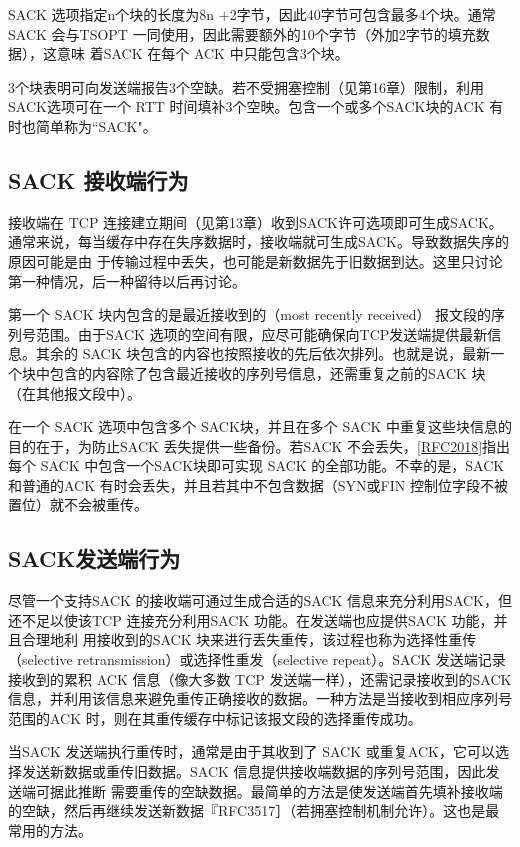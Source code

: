 SACK 选项指定n个块的长度为8n +2字节，因此40字节可包含最多4个块。通常SACK 会与TSOPT 一同使用，因此需要额外的10个字节（外加2字节的填充数据），这意味
着SACK 在每个 ACK 中只能包含3个块。

3个块表明可向发送端报告3个空缺。若不受拥塞控制（见第16章）限制，利用SACK选项可在一个 RTT 时间填补3个空映。包含一个或多个SACK块的ACK 有时也简单称为“SACK"。

\subsection{SACK 接收端行为}
接收端在 TCP 连接建立期间（见第13章）收到SACK许可选项即可生成SACK。通常来说，每当缓存中存在失序数据时，接收端就可生成SACK。导致数据失序的原因可能是由
于传输过程中丢失，也可能是新数据先于旧数据到达。这里只讨论第一种情况，后一种留待以后再讨论。

第一个 SACK 块内包含的是最近接收到的（most recently received） 报文段的序列号范围。由于SACK 选项的空间有限，应尽可能确保向TCP发送端提供最新信息。其余的
SACK 块包含的内容也按照接收的先后依次排列。也就是说，最新一个块中包含的内容除了包含最近接收的序列号信息，还需重复之前的SACK 块（在其他报文段中）。

在一个 SACK 选项中包含多个 SACK块，并且在多个 SACK 中重复这些块信息的目的在于，为防止SACK 丢失提供一些备份。若SACK 不会丢失，\href{https://www.rfc-editor.org/rfc/rfc2018}{[RFC2018]}指出每个 SACK
中包含一个SACK块即可实现 SACK 的全部功能。不幸的是，SACK 和普通的ACK 有时会丢失，并且若其中不包含数据（SYN或FIN 控制位字段不被置位）就不会被重传。

\subsection{SACK发送端行为}
尽管一个支持SACK 的接收端可通过生成合适的SACK 信息来充分利用SACK，但还不足以使该TCP 连接充分利用SACK 功能。在发送端也应提供SACK 功能，并且合理地利
用接收到的SACK 块来进行丢失重传，该过程也称为选择性重传（selective retransmission）或选择性重发（selective repeat）。SACK 发送端记录接收到的累积 ACK 信息（像大多数 TCP
发送端一样），还需记录接收到的SACK 信息，并利用该信息来避免重传正确接收的数据。一种方法是当接收到相应序列号范围的ACK 时，则在其重传缓存中标记该报文段的选择重传成功。

当SACK 发送端执行重传时，通常是由于其收到了 SACK 或重复ACK，它可以选择发送新数据或重传旧数据。SACK 信息提供接收端数据的序列号范围，因此发送端可据此推断
需要重传的空缺数据。最简单的方法是使发送端首先填补接收端的空缺，然后再继续发送新数据『RFC3517］（若拥塞控制机制允许）。这也是最常用的方法。

